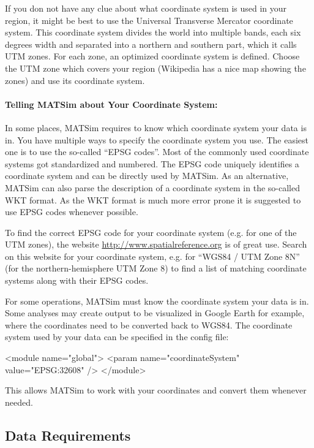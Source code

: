 If you don not have any clue about what coordinate system is used in your region, it might be best to use the Universal Transverse Mercator coordinate system. This coordinate system divides the world into multiple bands, each six degrees width and separated into a northern and southern part, which it calls UTM zones. For each zone, an optimized coordinate system is defined. Choose the UTM zone which covers your region (Wikipedia has a nice map showing the zones) and use its coordinate system. 

\paragraph{Telling MATSim about Your Coordinate System:}
In some places, MATSim requires to know which coordinate system your data is in. You have multiple ways to specify the coordinate system you use. The easiest one is to use the so-called ``EPSG codes''. Most of the commonly used coordinate systems got standardized and numbered. The EPSG code uniquely identifies a coordinate system and can be directly used by MATSim. As an alternative, MATSim can also parse the description of a coordinate system in the so-called WKT format. As the WKT format is much more error prone it is suggested to use EPSG codes whenever possible.

To find the correct EPSG code for your coordinate system (e.g. for one of the UTM zones), the website \url{http://www.spatialreference.org} is of great use. Search on this website for your coordinate system, e.g. for ``WGS84 / UTM Zone 8N'' (for the northern-hemisphere UTM Zone 8) to find a list of matching coordinate systems along with their EPSG codes.

For some operations, MATSim must know the coordinate system your data is in. Some analyses may create output to be visualized in Google Earth for example, where the coordinates need to be converted back to WGS84. The coordinate system used by your data can be specified in the config file:

\begin{xml}
<module name="global"> 
  <param name="coordinateSystem" value="EPSG:32608" /> 
</module>
\end{xml}

This allows MATSim to work with your coordinates and convert them whenever needed. 

\subsection{Data Requirements}
